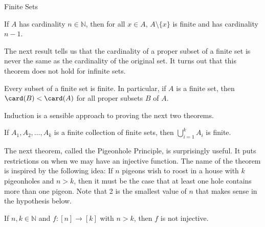 \begin{section}{Finite Sets}
\begin{theorem}\label{thm:decreaseCardinality}
If $A$ has cardinality $n\in\mathbb{N}$, then for all $x\in A$, $A\setminus \{x\}$ is finite and has cardinality $n-1$. 
\end{theorem}

The next result tells us that the cardinality of a proper subset of a finite set is never the same as the cardinality of the original set.  It turns out that this theorem does not hold for infinite sets. 

\begin{theorem}\label{thm:cardinalityProperSubsetsFinite}
Every subset of a finite set is finite. In particular, if $A$ is a finite set, then $\card(B)<\card(A)$ for all proper subsets $B$ of $A$.
\end{theorem}

Induction is a sensible approach to proving the next two theorems.

\begin{theorem}
If $A_1,A_2,\ldots, A_k$ is a finite collection of finite sets, then $\displaystyle \bigcup_{i=1}^k A_i$ is finite.
\end{theorem}

The next theorem, called the Pigeonhole Principle, is surprisingly useful. It puts restrictions on when we may have an injective function. The name of the theorem is inspired by the following idea: If $n$ pigeons wish to roost in a house with $k$ pigeonholes and $n>k$, then it must be the case that at least one hole contains more than one pigeon.  Note that 2 is the smallest value of $n$ that makes sense in the hypothesis below.

\begin{theorem}
If $n,k\in\mathbb{N}$ and $f:[n]\to [k]$ with $n>k$, then $f$ is not injective.%
\end{theorem}

\end{section}